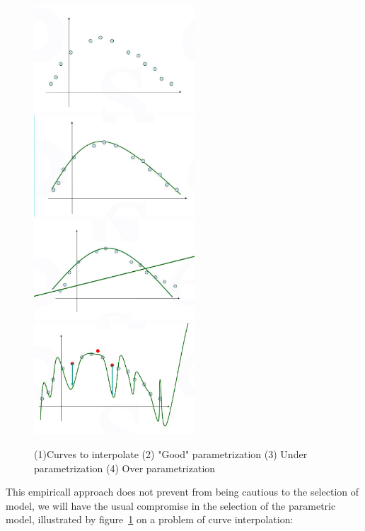 \begin{figure}
\centering
\includegraphics[width=6cm]{Methods/Images/Courbe-Pts.jpg}
\includegraphics[width=6cm]{Methods/Images/CourbeGoodParam.jpg}\\
\includegraphics[width=6cm]{Methods/Images/Courbe-UndeParam.jpg}
\includegraphics[width=6cm]{Methods/Images/CourbeOverParam.jpg}
	\caption{(1)Curves to interpolate (2) "Good" parametrization (3) Under parametrization (4) Over parametrization}
	\label{fig:CurvesParam}
\end{figure}


This empiricall approach does not prevent from being cautious
to the selection of model, we will have the usual compromise in the selection
of the parametric model, illustrated by figure~\ref{fig:CurvesParam}  on a problem of curve interpolation:


